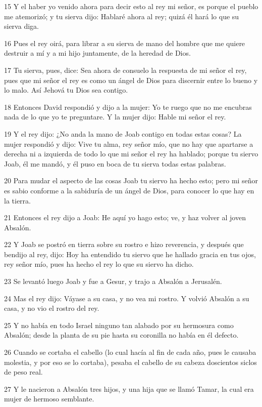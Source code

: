 \par 15 Y el haber yo venido ahora para decir esto al rey mi señor, es porque el pueblo me atemorizó; y tu sierva dijo: Hablaré ahora al rey; quizá él hará lo que su sierva diga.
\par 16 Pues el rey oirá, para librar a su sierva de mano del hombre que me quiere destruir a mí y a mi hijo juntamente, de la heredad de Dios.
\par 17 Tu sierva, pues, dice: Sea ahora de consuelo la respuesta de mi señor el rey, pues que mi señor el rey es como un ángel de Dios para discernir entre lo bueno y lo malo. Así Jehová tu Dios sea contigo.
\par 18 Entonces David respondió y dijo a la mujer: Yo te ruego que no me encubras nada de lo que yo te preguntare. Y la mujer dijo: Hable mi señor el rey.
\par 19 Y el rey dijo: ¿No anda la mano de Joab contigo en todas estas cosas? La mujer respondió y dijo: Vive tu alma, rey señor mío, que no hay que apartarse a derecha ni a izquierda de todo lo que mi señor el rey ha hablado; porque tu siervo Joab, él me mandó, y él puso en boca de tu sierva todas estas palabras.
\par 20 Para mudar el aspecto de las cosas Joab tu siervo ha hecho esto; pero mi señor es sabio conforme a la sabiduría de un ángel de Dios, para conocer lo que hay en la tierra.
\par 21 Entonces el rey dijo a Joab: He aquí yo hago esto; ve, y haz volver al joven Absalón.
\par 22 Y Joab se postró en tierra sobre su rostro e hizo reverencia, y después que bendijo al rey, dijo: Hoy ha entendido tu siervo que he hallado gracia en tus ojos, rey señor mío, pues ha hecho el rey lo que su siervo ha dicho.
\par 23 Se levantó luego Joab y fue a Gesur, y trajo a Absalón a Jerusalén.
\par 24 Mas el rey dijo: Váyase a su casa, y no vea mi rostro. Y volvió Absalón a su casa, y no vio el rostro del rey.
\par 25 Y no había en todo Israel ninguno tan alabado por su hermosura como Absalón; desde la planta de su pie hasta su coronilla no había en él defecto.
\par 26 Cuando se cortaba el cabello (lo cual hacía al fin de cada año, pues le causaba molestia, y por eso se lo cortaba), pesaba el cabello de su cabeza doscientos siclos   de peso real.
\par 27 Y le nacieron a Absalón tres hijos, y una hija que se llamó Tamar, la cual era mujer de hermoso semblante.
